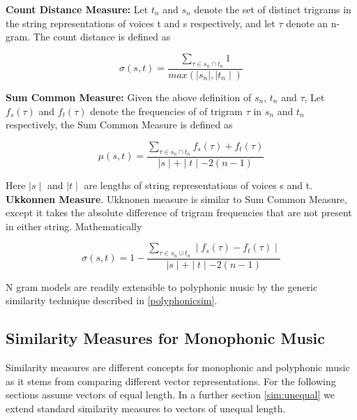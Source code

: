 \noindent \textbf{Count Distance Measure:} Let $t_n$ and $s_n$ denote the set of distinct trigrams in the string representations of voices t and s respectively, and let $\tau$ denote an n-gram. The count distance is defined as 

\begin{equation}
\sigma(s, t) = \frac{\sum_{\tau \in s_n \cap t_n} 1}{max (\mid s_n \mid, \mid t_n \mid)}
\end{equation}

\noindent \textbf{Sum Common Measure:} Given the above definition of $s_n$, $t_n$ and $\tau$, Let $f_s(\tau)$ and $f_t(\tau)$ denote the frequencies of of trigram $\tau$ in $s_n$  and $t_n$ respectively, the Sum Common Measure is defined as

\begin{equation}
\mu(s, t) = \frac{\sum_{\tau \in s_n \cap t_n} f_s(\tau) + f_t(\tau)}{\mid s \mid + \mid t \mid - 2(n-1)}
\end{equation}

Here $\mid s \mid$ and $\mid t \mid$ are lengths of string representations of voices s and t. \\

\noindent \textbf{Ukkonnen Measure}. Ukknonen measure is similar to Sum Common Measure, except it takes the absolute difference of trigram frequencies that are not present in either string. Mathematically 

\begin{equation}
\sigma(s, t) = 1 - \frac{\sum_{\tau \in s_n \cup t_n} \mid f_s(\tau) - f_t(\tau) \mid}{\mid s \mid + \mid t \mid - 2(n-1)}
\end{equation}

\noindent N gram models are readily extensible to polyphonic music by the generic similarity technique described in \ref{polyphonicsim}.

\subsection{Similarity Measures for Monophonic Music} \label{monophonicSim}

\noindent Similarity measures are different concepts for monophonic and polyphonic music as it stems from comparing different vector representations. For the following sections assume vectors of equal length. In a further section \ref{sim:unequal} we extend standard similarity measures to vectors of unequal length. \\

